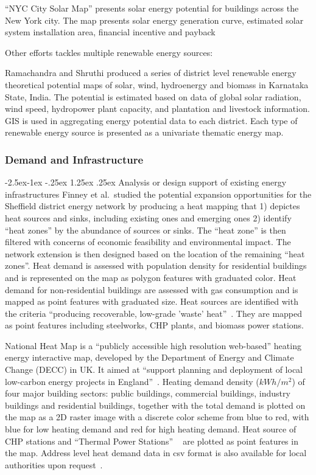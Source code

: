 \documentclass[hidelinks,12pt]{article}
\makeatletter
\renewcommand\paragraph{\@startsection{paragraph}{4}{\z@}%
            {-2.5ex\@plus -1ex \@minus -.25ex}%
            {1.25ex \@plus .25ex}%
            {\normalfont\normalsize\bfseries}}
\makeatother
\begin{document}
``NYC City Solar Map'' presents solar energy potential for
buildings across the New York city. The map presents solar energy
generation curve, estimated solar system installation area, financial
incentive and payback~\cite{NYCSolarMap}

Other efforts tackles multiple renewable energy sources:

Ramachandra and Shruthi produced a series of district level renewable
energy theoretical potential maps of solar, wind, hydroenergy and
biomass in Karnataka State, India. The potential is estimated based on
data of global solar radiation, wind speed, hydropower plant capacity,
and plantation and livestock information. GIS is used in aggregating
energy potential data to each district. Each type of renewable energy
source is presented as a univariate thematic energy map.

\subsubsection{Demand and Infrastructure}
\paragraph{Analysis or design support of existing energy
  infrastructures}\label{infra}
Finney et al.\ studied the potential expansion opportunities for the
Sheffield district energy network by producing a heat mapping that 1)
depictes heat sources and sinks, including existing ones and emerging
ones 2) identify ``heat zones'' by the abundance of sources or
sinks. The ``heat zone'' is then filtered with concerns of economic
feasibility and environmental impact. The network extension is then
designed based on the location of the remaining ``heat zones''. Heat
demand is assessed with population density for residential buildings
and is represented on the map as polygon features with graduated
color. Heat demand for non-residential buildings are assessed with gas
consumption and is mapped as point features with graduated size. Heat
sources are identified with the criteria ``producing recoverable,
low-grade 'waste' heat''~\cite{Finney2012165}. They are mapped as
point features including steelworks, CHP plants, and biomass power
stations.

National Heat Map is a ``publicly accessible high resolution
web-based'' heating energy interactive map, developed by the
Department of Energy and Climate Change (DECC) in UK. It aimed at
``support planning and deployment of local low-carbon energy projects
in England''~\cite{heatMap2015}. Heating demand density ($kWh/m^2$) of
four major building sectors: public buildings, commercial buildings,
industry buildings and residential buildings, together with the total
demand is plotted on the map as a 2D raster image with a discrete
color scheme from blue to red, with blue for low heating demand and
red for high heating demand. Heat source of CHP stations and ``Thermal
Power Stations'' ~\cite{heatMap2012} are plotted as point features in
the map. Address level heat demand data in csv format is also
available for local authorities upon request~\cite{heatMapLocal2012}.
\end{document}
